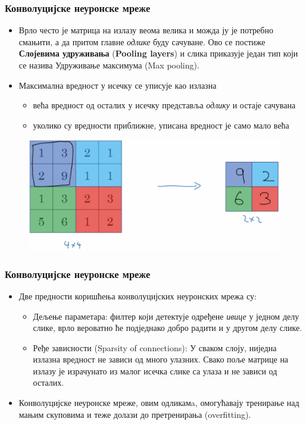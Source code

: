 \begin{frame}
\frametitle{Конволуцијске неуронске мреже}
\begin{itemize}
 \item Врло често је матрица на излазу веома велика и можда ју је потребно
  смањити, а да притом главне \textit{одлике} буду сачуване.
  Ово се постиже \textbf{Слојевима удруживања} (\textbf{Pooling layers}) и
  слика приказује један тип који се назива
  \alert{Удруживање максимума} (\alert{Max pooling}).
 \item Максимална
  вредност у исечку се уписује као излазна
  \begin{itemize}
   \item већа вредност од осталих у исечку представља
   \textit{одлику} и остаје сачувана
   \item уколико су вредности приближне, уписана вредност
   је само мало већа
  \end{itemize}

\end{itemize}
\begin{figure}[H]
  \centering
      \includegraphics[scale=0.18]{slike/ngMaxPool.png}
  \label{fig:ng_MaxPool}
\end{figure}
\end{frame}

\begin{frame}
\frametitle{Конволуцијске неуронске мреже}
\begin{itemize}
 \item Две \alert{предности коришћења конволуцијских неуронских мрежа} су:
 \begin{itemize}
  \item \alert{Дељење параметара}: филтер који детектује одређене \textit{ивице}
 у једном делу слике, врло вероватно ће подједнако добро радити
 и у другом делу слике.
 
 \item \alert{Ређе зависности} (\alert{Sparsity of connections}):
 У сваком слоју, ниједна излазна вредност не зависи од много улазних.
 Свако поље матрице на излазу је
 израчунато из малог исечка слике са улаза и не зависи од осталих.
 \end{itemize}
 \item Конволуцијске неуронске мреже, овим одликамa,
 омогућавају \alert{тренирање над мањим скуповима} и 
  \alert{теже долази до претренирања} (\alert{overfitting}).
\end{itemize}
\end{frame}
